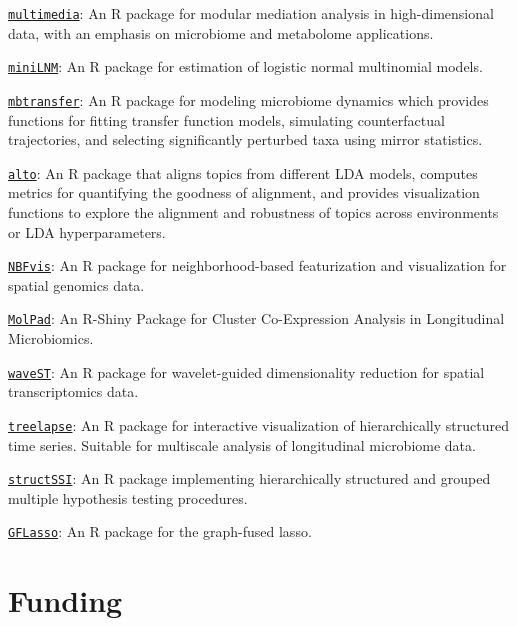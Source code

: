 \documentclass[letterpaper]{article}
\renewenvironment{itemize}{
  \begin{list}{}{
    \setlength{\leftmargin}{1.5em}
  }
}{
  \end{list}
}
\begin{document}
\begin{itemize}
\item \href{https://krisrs1128.github.io/multimedia/}{\texttt{multimedia}}: An R package for modular mediation analysis in high-dimensional data, with
an emphasis on microbiome and metabolome applications. 
\item \href{https://cran.r-project.org/web/packages/miniLNM/index.html}{\texttt{miniLNM}}: An R package for estimation of logistic normal multinomial models.
\item \href{https://krisrs1128.github.io/mbtransfer/}{\texttt{mbtransfer}}: An R
package for modeling microbiome dynamics which provides functions for fitting
transfer function models, simulating counterfactual trajectories, and selecting
significantly perturbed taxa using mirror statistics.
\item \href{https://lasy.github.io/alto/}{\texttt{alto}}: An R package that
aligns topics from different LDA models, computes metrics for quantifying the
goodness of alignment, and provides visualization functions to explore the
alignment and robustness of topics across environments or LDA hyperparameters.
\item \href{https://github.com/XTH1114/NBFvis}{\texttt{NBFvis}}: An R package for neighborhood-based featurization and
visualization for spatial genomics data.
\item \href{https://kaiyanm.github.io/MolPad/}{\texttt{MolPad}}: An R-Shiny Package for Cluster Co-Expression
Analysis in Longitudinal Microbiomics.
\item \href{https://github.com/OliverXUZY/waveST/}{\texttt{waveST}}: An R
package for wavelet-guided dimensionality reduction for spatial transcriptomics
data.
\item \href{https://krisrs1128.github.io/treelapse/}{\texttt{treelapse}}: An R
package for interactive visualization of hierarchically structured time series.
Suitable for multiscale analysis of longitudinal microbiome data.
\item \href{https://github.com/krisrs1128/structSSI}{\texttt{structSSI}}: An R
package implementing hierarchically structured and grouped multiple hypothesis
testing procedures.
\item \href{https://github.com/krisrs1128/GFLasso}{\texttt{GFLasso}}: An R
package for the graph-fused lasso.
\end{itemize}

\section*{Funding}
\end{document}
